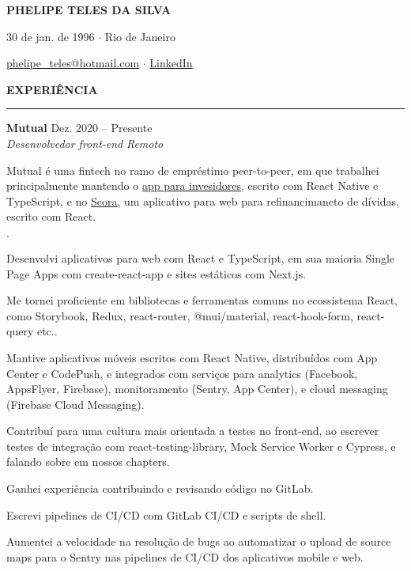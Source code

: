 \documentclass[12pt]{article}
\newenvironment{tightlist}
  {\begin{list}
    {$\cdot$}
    {
      \setlength{\leftmargin}{0em}
      \setlength{\itemsep}{-\smallskipamount}
    }
  }
{\end{list}}
\begin{document}
\pagestyle{empty}

\centerline{\huge\bf PHELIPE TELES DA SILVA}
\medskip

\centerline{30 de jan. de 1996 $\cdot$ Rio de Janeiro}
\smallskip

\centerline{
  \href{mailto:phelipe_teles@hotmail.com}{phelipe\_teles@hotmail.com}
  $\cdot$
  \href{https://linkedin.com/in/phelipeteles}{LinkedIn}
}
\smallskip

\medskip \textbf{EXPERIÊNCIA} \medskip
\hrule

\textbf{Mutual} \hfill Dez. 2020 -- Presente \\
\textit{Desenvolvedor front-end} \hfill \textit{Remoto} {\parfillskip=0pt\par}

Mutual é uma fintech no ramo de empréstimo peer-to-peer, em que trabalhei
principalmente mantendo o \href{https://mutual.club/en/invest.html}{app para
invesidores}, escrito com React Native e TypeScript, e no
\href{https://scora.com.br/}{Scora}, um aplicativo para web para refinancimaneto
de dívidas, escrito com React.

\medskip

\begin{tightlist}
  \item Desenvolvi aplicativos para web com React e TypeScript, em sua maioria
    Single Page Apps com create-react-app e sites estáticos com Next.js.
  \item Me tornei proficiente em bibliotecas e ferramentas comuns no ecossistema
    React, como Storybook, Redux, react-router, @mui/material, react-hook-form,
    react-query etc..
  \item Mantive aplicativos móveis escritos com React Native, distribuídos com
    App Center e CodePush, e integrados com serviços para analytics (Facebook,
    AppsFlyer, Firebase), monitoramento (Sentry, App Center), e cloud messaging
    (Firebase Cloud Messaging).
  \item Contribuí para uma cultura mais orientada a testes no front-end,
    ao escrever testes de integração com react-testing-library, Mock Service
    Worker e Cypress, e falando sobre em nossos chapters.
  \item Ganhei experiência contribuindo e revisando código no GitLab.
  \item Escrevi pipelines de CI/CD com GitLab CI/CD e scripts de shell.
  \item Aumentei a velocidade na resolução de bugs ao automatizar o upload de
    source maps para o Sentry nas pipelines de CI/CD dos aplicativos mobile e
    web.
\end{tightlist}
\end{document}
